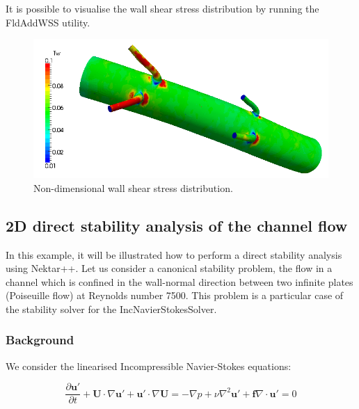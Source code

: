 It is possible to visualise the wall shear stress distribution by running the FldAddWSS utility. 

\begin{figure}
\begin{center}
\includegraphics[width=12cm]{Figures/WSS.png}
\caption{Non-dimensional wall shear stress distribution.}
\end{center}
\end{figure}
 
 \subsection{2D direct stability analysis of the channel flow}
 
  In this example, it will be illustrated how to perform a direct stability analysis using Nektar++. Let us consider a canonical stability problem, the flow in a channel which is confined in the wall-normal direction between two infinite plates (Poiseuille flow) at Reynolds number 7500. This problem is a particular case of the stability solver for the IncNavierStokesSolver. 
  
 \subsubsection{Background}
 
  We consider the linearised Incompressible Navier-Stokes equations: 
  
  \begin{subequations}
  \begin{equation}
    \frac{\partial \mathbf{u'}}{\partial t} + \mathbf{U} \cdot  \nabla \mathbf{u'}+\mathbf{u'} \cdot \nabla \mathbf{U} = -\nabla p + \nu \nabla^2 \mathbf{u'} + \mathbf{f}
  \end{equation}
  
  \begin{equation}
  \nabla \cdot \mathbf{u'} = 0
  \end{equation}
  \end{subequations}
  
